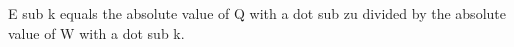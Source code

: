 E sub k equals the absolute value of Q with a dot sub zu divided by the absolute value of W with a dot sub k.